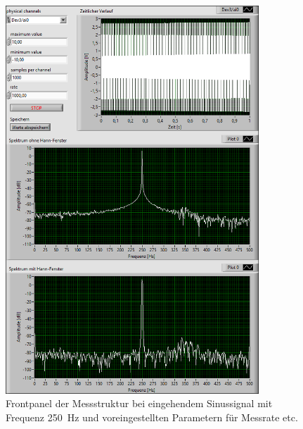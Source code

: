 \begin{figure}[H]
	\centering
	\includegraphics[width=0.85\textwidth]{pic/abtast_250Hz.png}	
	\caption{Frontpanel der Messstruktur bei eingehendem Sinussignal mit Frequenz \SI{250}{\hertz} und voreingestellten Parametern für Messrate etc.}
	\label{fig:abtast_250Hz}
\end{figure}

